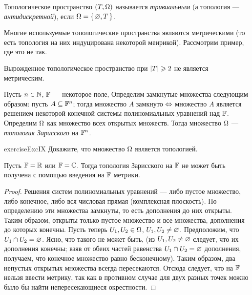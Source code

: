 \documentclass[main]{subfiles}
\begin{document}
\begin{definition}
	Топологическое пространство $(T, \Omega)$ называется \emph{тривиальным} (а топология --- \emph{антидискретной}),
	если $ \Omega = \left\{\, \varnothing, T \,\right\} $.
\end{definition}

Многие используемые топологические пространства являются метрическими (то есть топология на них индуцирована некоторой
меирикой). Рассмотрим пример, где это не так.

\begin{remark}
	Вырожденное топологическое пространство при $ \left\vert T\right\vert \geqslant 2 $ не является метрическим.
\end{remark}

\begin{definition}
	Пусть $ n \in \mathbb{N} $, $ \mathbb{F} $ --- некоторое поле, Определим замкнутые множества следующим образом:
	пусть $ A \subseteq \mathbb{F}^n $; тогда множество $ A $ замкнуто $\Leftrightarrow$ множество $ A $ является решением некоторой конечной
	системы полиномиальных уравнений над $ \mathbb{F} $. Определим $ \Omega $ как множество всех открытых множеств. Тогда
	множество $ \Omega $ --- \emph{топология Зарисского} на $ \mathbb{F}^n $.
\end{definition}

\begin{restatable}{exercise}{ExcIX}
	Докажите, что множество $ \Omega $ является топологией.
\end{restatable}

\begin{statement}
	Пусть $ \mathbb{F} = \mathbb{R} $ или $ \mathbb{F} = \mathbb{C} $. Тогда топология Зарисского на $ \mathbb{F} $ не может быть получена с помощью введения на $ \mathbb{F} $
	метрики.
\end{statement}

\begin{proof}
	Решения систем полиномиальных уравнений --- либо пустое множество, либо конечное, либо вся числовая прямая
	(комплексная плоскость). По определению эти множества замкнуты, то есть дополнения до них открыты.
	Таким образом, открыты только пустое множество и все множества, дополнения до которых конечны.
	Пусть теперь $ U_1, U_2 \in \Omega $, $ U_1, U_2 \neq \varnothing $. Предположим, что $ U_1 \cap U_2 = \varnothing $. Ясно, что такого не может быть,
	(из $ U_1, U_2 \neq \varnothing $ следует, что их дополнения конечны; взяв от обеих частей равенства
	$ U_1 \cap U_2 = \varnothing $ дополнения, получаем, что конечное множество равно бесконечному).
	Таким образом, два непустых открытых множества всегда пересекаются. Отсюда следует, что на $ \mathbb{F} $ нельзя
	ввести метрику, так как в противном случае для двух разных точек можно было бы найти непересекающиеся окрестности.
\end{proof}
\end{document}
